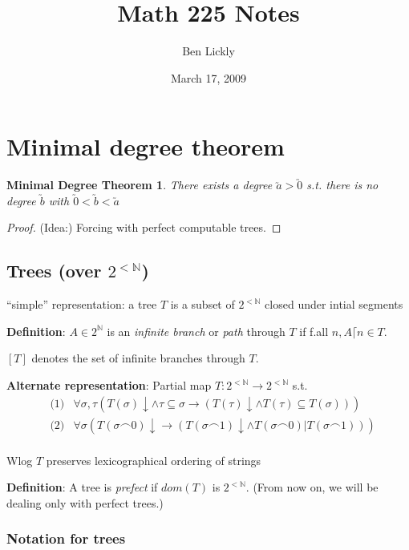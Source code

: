 \documentclass[12pt]{article}
\author{Ben Lickly}
\date{March 17, 2009}
\title{Math 225 Notes}
\newcommand{\Nat}{\ensuremath{\mathbb{N}}}
\newcommand{\defn}{\textbf{Definition}: }
\begin{document}
\maketitle

\section{Minimal degree theorem}

\newtheorem*{mindeg}{Minimal Degree Theorem}
\begin{mindeg}
  There exists a degree $\utilde{a} > \utilde{0}$ s.t. 
  there is no degree $\utilde{b}$ with $\utilde{0} < \utilde{b} < \utilde{a}$
\end{mindeg}
\begin{proof}
  (Idea:) Forcing with perfect computable trees.
\end{proof}

\subsection{Trees
(over $2^{<\Nat}$)}

``simple'' representation:
a tree $T$ is a subset of $2^{<\Nat}$ closed under intial segments

\defn $A \in 2^\Nat$ is an \emph{infinite branch} or \emph{path} through $T$
if f.all $n, A \lceil n \in T$.

$[T]$ denotes the set of infinite branches through $T$.

\textbf{Alternate representation}:
Partial map $T: 2^{<\Nat} \rightarrow 2^{<\Nat}$ s.t.
\begin{align*}
  &\text{(1)}&
     \forall \sigma,\tau 
        \left(T(\sigma)\downarrow \wedge \tau \subseteq \sigma \rightarrow
             (T(\tau)\downarrow \wedge T(\tau) \subseteq T(\sigma)) \right) \\
  &\text{(2)}&
     \forall \sigma \left(T(\sigma \frown 0) \downarrow \rightarrow
        (T(\sigma \frown 1)\downarrow \wedge T(\sigma \frown 0) | %
                T(\sigma \frown 1)) \right) \\
\end{align*}

Wlog $T$ preserves lexicographical ordering of strings

\defn A tree is \emph{prefect} if $dom(T)$ is $2^{<\Nat}$.
(From now on, we will be dealing only with perfect trees.)

\subsubsection{Notation for trees}
\end{document}
